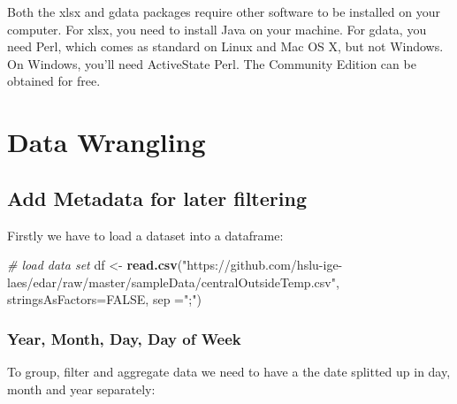 \documentclass[
]{book}
\newenvironment{Shaded}{\begin{snugshade}}{\end{snugshade}}
\newcommand{\CommentTok}[1]{\textcolor[rgb]{0.56,0.35,0.01}{\textit{#1}}}
\newcommand{\DataTypeTok}[1]{\textcolor[rgb]{0.13,0.29,0.53}{#1}}
\newcommand{\KeywordTok}[1]{\textcolor[rgb]{0.13,0.29,0.53}{\textbf{#1}}}
\newcommand{\NormalTok}[1]{#1}
\newcommand{\OtherTok}[1]{\textcolor[rgb]{0.56,0.35,0.01}{#1}}
\newcommand{\StringTok}[1]{\textcolor[rgb]{0.31,0.60,0.02}{#1}}
\let\oldShaded\Shaded
\let\endoldShaded\endShaded
\renewenvironment{Shaded}{\footnotesize\oldShaded}{\endoldShaded}
\begin{document}
Both the xlsx and gdata packages require other software to be installed on your computer. For xlsx, you need to install Java on your machine. For gdata, you need Perl, which comes as standard on Linux and Mac OS X, but not Windows. On Windows, you'll need ActiveState Perl. The Community Edition can be obtained for free.

\hypertarget{data-wrangling}{%
\chapter{Data Wrangling}\label{data-wrangling}}

\hypertarget{add-metadata-for-later-filtering}{%
\section{Add Metadata for later filtering}\label{add-metadata-for-later-filtering}}

Firstly we have to load a dataset into a dataframe:

\begin{Shaded}
\begin{Highlighting}[]
\CommentTok{# load data set}
\NormalTok{df <-}\StringTok{ }\KeywordTok{read.csv}\NormalTok{(}\StringTok{"https://github.com/hslu-ige-laes/edar/raw/master/sampleData/centralOutsideTemp.csv"}\NormalTok{,}
               \DataTypeTok{stringsAsFactors=}\OtherTok{FALSE}\NormalTok{,}
               \DataTypeTok{sep =}\StringTok{";"}\NormalTok{)}
\end{Highlighting}
\end{Shaded}

\hypertarget{year-month-day-day-of-week}{%
\subsection{Year, Month, Day, Day of Week}\label{year-month-day-day-of-week}}

To group, filter and aggregate data we need to have a the date splitted up in day, month and year separately:
\end{document}
